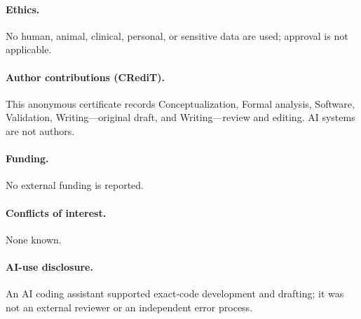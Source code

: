 \documentclass[10pt]{article}
\begin{document}
\paragraph{Ethics.} No human, animal, clinical, personal, or sensitive data
are used; approval is not applicable.
\paragraph{Author contributions (CRediT).} This anonymous certificate records
Conceptualization, Formal analysis, Software, Validation, Writing---original
draft, and Writing---review and editing.  AI systems are not authors.
\paragraph{Funding.} No external funding is reported.
\paragraph{Conflicts of interest.} None known.
\paragraph{AI-use disclosure.} An AI coding assistant supported exact-code
development and drafting; it was not an external reviewer or an independent
error process.
\fi\fi
\end{document}
